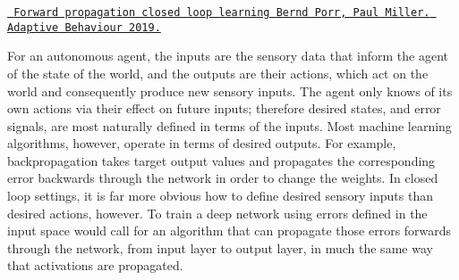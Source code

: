 \href{https://journals.sagepub.com/doi/10.1177/1059712319851070}{\texttt{ Forward propagation closed loop learning Bernd Porr, Paul Miller. Adaptive Behaviour 2019.}}

 

For an autonomous agent, the inputs are the sensory data that inform the agent of the state of the world, and the outputs are their actions, which act on the world and consequently produce new sensory inputs. The agent only knows of its own actions via their effect on future inputs; therefore desired states, and error signals, are most naturally defined in terms of the inputs. Most machine learning algorithms, however, operate in terms of desired outputs. For example, backpropagation takes target output values and propagates the corresponding error backwards through the network in order to change the weights. In closed loop settings, it is far more obvious how to define desired sensory inputs than desired actions, however. To train a deep network using errors defined in the input space would call for an algorithm that can propagate those errors forwards through the network, from input layer to output layer, in much the same way that activations are propagated. 